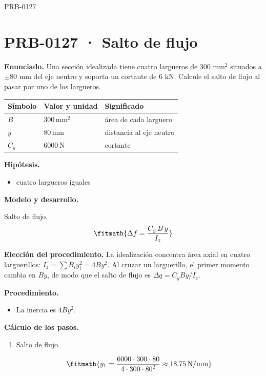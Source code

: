 \begin{studiumworked}{PRB-0127}

\section{PRB-0127 · Salto de flujo}

\textbf{Enunciado.} Una sección idealizada tiene cuatro largueros de 300 mm$^2$ situados a $\pm 80$ mm del eje neutro y soporta un cortante de 6 kN. Calcule el salto de flujo al pasar por uno de los largueros.

\par\medskip\noindent\begin{tabular}{@{}p{.18\linewidth}p{.26\linewidth}p{.48\linewidth}@{}}
\toprule Símbolo & Valor y unidad & Significado\\\midrule
$B$ & $300\,\mathrm{mm^2}$ & área de cada larguero\\
$y$ & $80\,\mathrm{mm}$ & distancia al eje neutro\\
$C_{y}$ & $6000\,\mathrm{N}$ & cortante\\
\bottomrule\end{tabular}\par\medskip

\textbf{Hipótesis.}\begin{itemize}\item cuatro largueros iguales\end{itemize}

\textbf{Modelo y desarrollo.}

Salto de flujo.\[\fitmath{\Delta f = \frac{C_y\,B\,y}{I_z}}\]

\textbf{Elección del procedimiento.} La idealización concentra área axial en cuatro larguerillos: $I_z=\sum B_i y_i^2=4By^2$. Al cruzar un larguerillo, el primer momento cambia en $By$, de modo que el salto de flujo es $\Delta q=C_yBy/I_z$.

\textbf{Procedimiento.}\begin{itemize}\item La inercia es $4 B y^2$.\end{itemize}

\textbf{Cálculo de los pasos.}

\begin{enumerate}

\item Salto de flujo.

\[\fitmath{y_{1}=\frac{6000\cdot 300\cdot 80}{4\cdot 300\cdot {80}^{2}}\approx 18.75\,\mathrm{N/mm}}\]


\end{enumerate}
\end{studiumworked}
